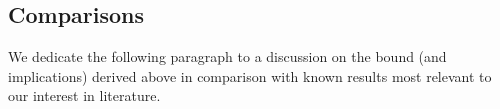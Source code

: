 \documentclass[nohyperref]{article}
\begin{document}


\subsection{Comparisons}

We dedicate the following paragraph to a discussion on the bound (and implications) derived above in comparison with known results most relevant to our interest in literature.
\end{document}
